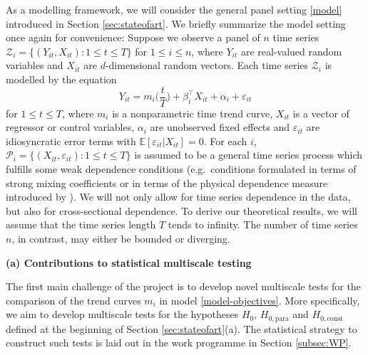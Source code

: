 \documentclass[a4paper,12pt]{article}
\begin{document}
As a modelling framework, we will consider the general panel setting \eqref{model} introduced in Section \ref{sec:stateofart}. We briefly summarize the model setting once again for convenience: Suppose we observe a panel of $n$ time series $\mathcal{Z}_i = \{(Y_{it},X_{it}): 1 \le t \le T\}$ for $ 1 \le i \le n$, where $Y_{it}$ are real-valued random variables and $X_{it}$ are $d$-dimensional random vectors. Each time series $\mathcal{Z}_i$ is modelled by the equation 
\begin{equation}\label{model-objectives}
Y_{it} = m_i \Big( \frac{t}{T} \Big) + \beta_i^\top X_{it} + \alpha_i + \varepsilon_{it} 
\end{equation}
for $ 1 \le t \le T$, where $m_i$ is a nonparametric time trend curve, $X_{it}$ is a vector of regressor or control variables, $\alpha_i$ are unobserved fixed effects and $\varepsilon_{it}$ are idiosyncratic error terms with $\mathbb{E}[\varepsilon_{it}|X_{it} ] = 0$. For each $i$, $\mathcal{P}_i = \{(X_{it},\varepsilon_{it}): 1 \le t \le T\}$ is assumed to be a general time series process which fulfills some weak dependence conditions (e.g.\ conditions formulated in terms of strong mixing coefficients or in terms of the physical dependence measure introduced by \cite{Wu2005}). We will not only allow for time series dependence in the data, but also for cross-sectional dependence. To derive our theoretical results, we will assume that the time series length $T$ tends to infinity. The number of time series $n$, in contrast, may either be bounded or diverging. 

\vspace{10pt}


\noindent \textbf{(a) Contributions to statistical multiscale testing} 
\vspace{10pt} 


\noindent The first main challenge of the project is to develop novel multiscale tests for the comparison of the trend curves $m_i$ in model \eqref{model-objectives}. More specifically, we aim to develop multiscale tests for the hypotheses $H_0$, $H_{0,\text{para}}$ and $H_{0,\text{const}}$ defined at the beginning of Section \ref{sec:stateofart}(a). The statistical strategy to construct such tests is laid out in the work programme in Section \ref{subsec:WP}. 
\end{document}
